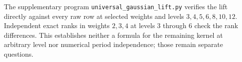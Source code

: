 The supplementary program \texttt{universal\_gaussian\_lift.py}
verifies the lift directly against every raw row at selected weights
and levels $3,4,5,6,8,10,12$. Independent exact ranks in weights
$2,3,4$ at levels $3$ through $6$ check the rank differences. This
establishes neither a formula for the remaining kernel at arbitrary
level nor numerical period independence; those remain separate
questions.
